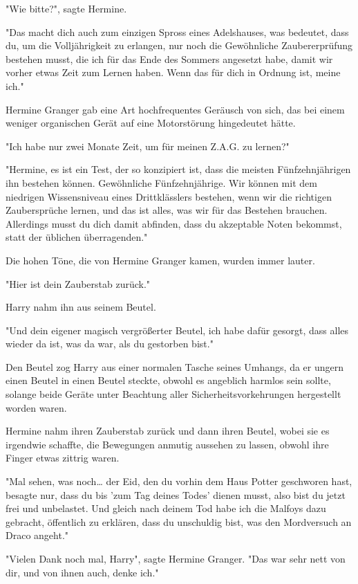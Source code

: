 {"Wie bitte?", sagte Hermine.

"Das macht dich auch zum einzigen Spross eines Adelshauses, was bedeutet, dass du, um die Volljährigkeit zu erlangen, nur noch die Gewöhnliche Zaubererprüfung bestehen musst, die ich für das Ende des Sommers angesetzt habe, damit wir vorher etwas Zeit zum Lernen haben. Wenn das für dich in Ordnung ist, meine ich."

Hermine Granger gab eine Art hochfrequentes Geräusch von sich, das bei einem weniger organischen Gerät auf eine Motorstörung hingedeutet hätte.

"Ich habe nur zwei Monate Zeit, um für meinen Z.A.G. zu lernen?"

"Hermine, es ist ein Test, der so konzipiert ist, dass die meisten Fünfzehnjährigen ihn bestehen können. Gewöhnliche Fünfzehnjährige. Wir können mit dem niedrigen Wissensniveau eines Drittklässlers bestehen, wenn wir die richtigen Zaubersprüche lernen, und das ist alles, was wir für das Bestehen brauchen. Allerdings musst du dich damit abfinden, dass du akzeptable Noten bekommst, statt der üblichen überragenden."

Die hohen Töne, die von Hermine Granger kamen, wurden immer lauter.

"Hier ist dein Zauberstab zurück."

Harry nahm ihn aus seinem Beutel.

"Und dein eigener magisch vergrößerter Beutel, ich habe dafür gesorgt, dass alles wieder da ist, was da war, als du gestorben bist."

Den Beutel zog Harry aus einer normalen Tasche seines Umhangs, da er ungern einen Beutel in einen Beutel steckte, obwohl es angeblich harmlos sein sollte, solange beide Geräte unter Beachtung aller Sicherheitsvorkehrungen hergestellt worden waren.

Hermine nahm ihren Zauberstab zurück und dann ihren Beutel, wobei sie es irgendwie schaffte, die Bewegungen anmutig aussehen zu lassen, obwohl ihre Finger etwas zittrig waren.

"Mal sehen, was noch… der Eid, den du vorhin dem Haus Potter geschworen hast, besagte nur, dass du bis 'zum Tag deines Todes' dienen musst, also bist du jetzt frei und unbelastet. Und gleich nach deinem Tod habe ich die Malfoys dazu gebracht, öffentlich zu erklären, dass du unschuldig bist, was den Mordversuch an Draco angeht."

"Vielen Dank noch mal, Harry", sagte Hermine Granger. "Das war sehr nett von dir, und von ihnen auch, denke ich."

}
